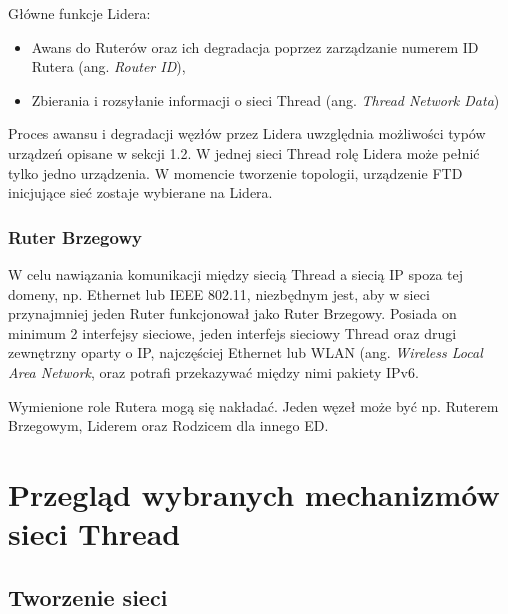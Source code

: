         Główne funkcje Lidera:
        \begin{itemize}
            \item Awans do Ruterów oraz ich degradacja poprzez zarządzanie numerem ID Rutera (ang. \textit{Router ID}),
            \item Zbierania i rozsyłanie informacji o sieci Thread (ang. \textit{Thread Network Data})
        \end{itemize}

        Proces awansu i degradacji węzłów przez Lidera uwzględnia możliwości typów urządzeń opisane w sekcji 1.2. W jednej sieci Thread rolę Lidera może pełnić tylko jedno urządzenia. W momencie tworzenie topologii, urządzenie FTD inicjujące sieć zostaje wybierane na Lidera.
        
        \subsubsection{Ruter Brzegowy}

        W celu nawiązania komunikacji między siecią Thread a siecią IP spoza tej domeny, np. Ethernet lub IEEE 802.11, niezbędnym jest, aby w sieci przynajmniej jeden Ruter funkcjonował jako Ruter Brzegowy. Posiada on minimum 2 interfejsy sieciowe, jeden interfejs sieciowy Thread oraz drugi zewnętrzny oparty o IP, najczęściej Ethernet lub WLAN (ang. \textit{Wireless Local Area Network}, oraz potrafi przekazywać między nimi pakiety IPv6.

    Wymienione role Rutera mogą się nakładać. Jeden węzeł może być np. Ruterem Brzegowym, Liderem oraz Rodzicem dla innego ED.

\section{Przegląd wybranych mechanizmów sieci Thread}

    \subsection{Tworzenie sieci}
    \label{subsec:network-forming}


